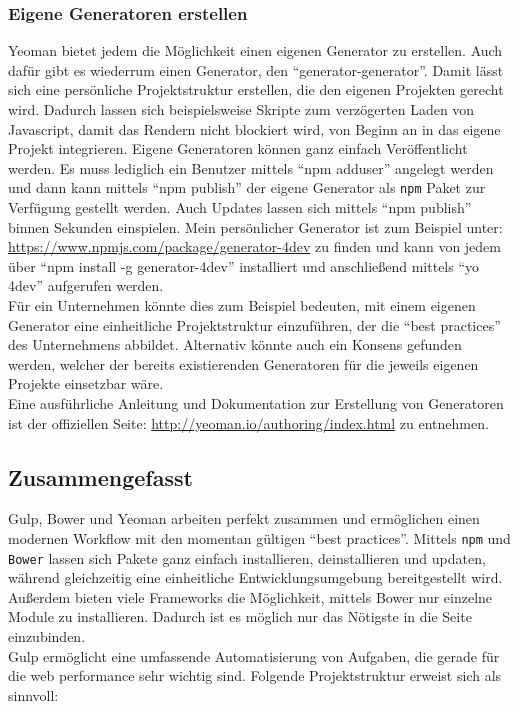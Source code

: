 		\subsubsection{Eigene Generatoren erstellen} %
		\label{ssub:eigene_generatoren_erstellen}
			Yeoman bietet jedem die Möglichkeit einen eigenen Generator zu erstellen. Auch dafür gibt es wiederrum einen Generator, den "`generator-generator"'. Damit lässt sich eine persönliche Projektstruktur erstellen, die den eigenen Projekten gerecht wird. Dadurch lassen sich beispielsweise Skripte zum verzögerten Laden von Javascript, damit das Rendern nicht blockiert wird, von Beginn an in das eigene Projekt integrieren. Eigene Generatoren können ganz einfach Veröffentlicht werden. Es muss lediglich ein Benutzer mittels "`npm adduser"' angelegt werden und dann kann mittels "`npm publish"' der eigene Generator als \texttt{npm} Paket zur Verfügung gestellt werden. Auch Updates lassen sich mittels "`npm publish"' binnen Sekunden einspielen. Mein persönlicher Generator ist zum Beispiel unter: \url{https://www.npmjs.com/package/generator-4dev} zu finden und kann von jedem über "`npm install -g generator-4dev"' installiert und anschließend mittels "`yo 4dev"' aufgerufen werden.\\

			Für ein Unternehmen könnte dies zum Beispiel bedeuten, mit einem eigenen Generator eine einheitliche Projektstruktur einzuführen, der die "`best practices"' des Unternehmens abbildet. Alternativ könnte auch ein Konsens gefunden werden, welcher der bereits existierenden Generatoren für die jeweils eigenen Projekte einsetzbar wäre.\\

			Eine ausführliche Anleitung und Dokumentation zur Erstellung von Generatoren ist der offiziellen Seite: \url{http://yeoman.io/authoring/index.html} zu entnehmen.
		
		

	\subsection{Zusammengefasst}
	\label{sub:zusammengefasst}
		Gulp, Bower und Yeoman arbeiten perfekt zusammen und ermöglichen einen modernen Workflow mit den momentan gültigen "`best practices"'. Mittels \texttt{npm} und \texttt{Bower} lassen sich Pakete ganz einfach installieren, deinstallieren und updaten, während gleichzeitig eine einheitliche Entwicklungsumgebung bereitgestellt wird. Außerdem bieten viele Frameworks die Möglichkeit, mittels Bower nur einzelne Module zu installieren. Dadurch ist es möglich nur das Nötigste in die Seite einzubinden.\\ Gulp ermöglicht eine umfassende Automatisierung von Aufgaben, die gerade für die web performance sehr wichtig sind. Folgende Projektstruktur erweist sich als sinnvoll:

